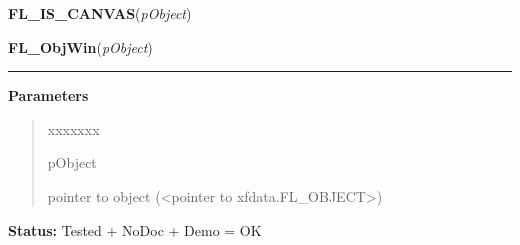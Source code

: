     \label{xformslib:library:FL_IS_CANVAS}

    \vspace{0.5ex}

\hspace{.8\funcindent}\begin{boxedminipage}{\funcwidth}

    \raggedright \textbf{FL\_IS\_CANVAS}(\textit{pObject})

\setlength{\parskip}{2ex}
\setlength{\parskip}{1ex}
    \end{boxedminipage}

    \label{xformslib:library:FL_ObjWin}

    \vspace{0.5ex}

\hspace{.8\funcindent}\begin{boxedminipage}{\funcwidth}

    \raggedright \textbf{FL\_ObjWin}(\textit{pObject})

    \vspace{-1.5ex}

    \rule{\textwidth}{0.5\fboxrule}
\setlength{\parskip}{2ex}
\setlength{\parskip}{1ex}
      \textbf{Parameters}
      \vspace{-1ex}

      \begin{quote}
        \begin{Ventry}{xxxxxxx}

          \item[pObject]

          pointer to object ({\textless}pointer to 
          xfdata.FL\_OBJECT{\textgreater})

        \end{Ventry}

      \end{quote}

\textbf{Status:} Tested + NoDoc + Demo = OK



    \end{boxedminipage}

    \label{xformslib:library:fl_get_real_object_window}

